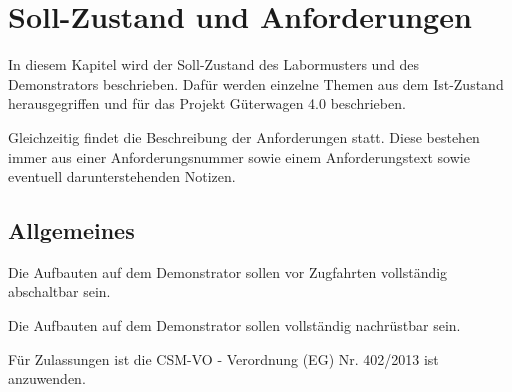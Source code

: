 \section{Soll-Zustand und Anforderungen}
In diesem Kapitel wird der Soll-Zustand des Labormusters und des Demonstrators beschrieben. Dafür werden einzelne Themen aus dem Ist-Zustand herausgegriffen und für das Projekt Güterwagen 4.0 beschrieben.\par
Gleichzeitig findet die Beschreibung der Anforderungen statt. Diese bestehen immer aus einer Anforderungsnummer sowie einem Anforderungstext sowie eventuell darunterstehenden Notizen.%

\subsection{Allgemeines}
\begin{feat}
Die Aufbauten auf dem Demonstrator sollen vor Zugfahrten vollständig abschaltbar sein.
\end{feat}
\begin{feat}
Die Aufbauten auf dem Demonstrator sollen vollständig nachrüstbar sein.
\end{feat}
\begin{feat}
Für Zulassungen ist die CSM-VO - Verordnung (EG) Nr. 402/2013 ist anzuwenden.
\end{feat}

